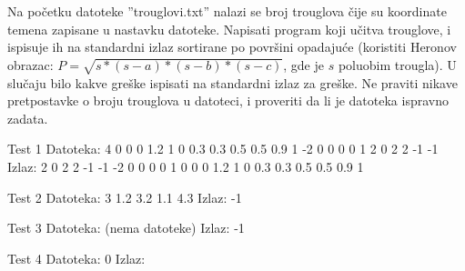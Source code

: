 \begin{Exercise}[label=905]

Na početku datoteke ''trouglovi.txt'' nalazi se broj trouglova čije su koordinate temena zapisane u nastavku datoteke. Napisati
  program koji učitva trouglove, i ispisuje ih na standardni izlaz
  sortirane po površini opadajuće (koristiti Heronov obrazac: 
  $P = \sqrt{s*(s-a)*(s-b)*(s-c)}$, gde je $s$ poluobim trougla). U slučaju bilo kakve greške ispisati  na standardni izlaz za greške. Ne praviti nikave pretpostavke o broju trouglova u datoteci, i proveriti da li je datoteka ispravno zadata.

\begin{miditest}
\begin{test}{Test 1}
Datoteka:  4                         
           0 0 0 1.2 1 0          
           0.3 0.3 0.5 0.5 0.9 1
           -2 0 0 0 0 1
           2 0 2 2 -1 -1
Izlaz:     2 0 2 2 -1 -1             
           -2 0 0 0 0 1
           0 0 0 1.2 1 0
           0.3 0.3 0.5 0.5 0.9 1                                                   
\end{test}
\end{miditest}
\begin{minitest}
\begin{test}{Test 2}
Datoteka:  3             
          1.2 3.2 1.1 4.3
Izlaz:     -1                                            
\end{test}
\end{minitest}

\begin{miditest}
\begin{test}{Test 3}
Datoteka:   (nema datoteke)
Izlaz:     -1                                            
\end{test}
\end{miditest}
\begin{minitest}
\begin{test}{Test 4}
Datoteka:   0
Izlaz:                                                 
\end{test}
\end{minitest}
\end{Exercise}

\begin{Answer}[ref=905]
\end{Answer}

